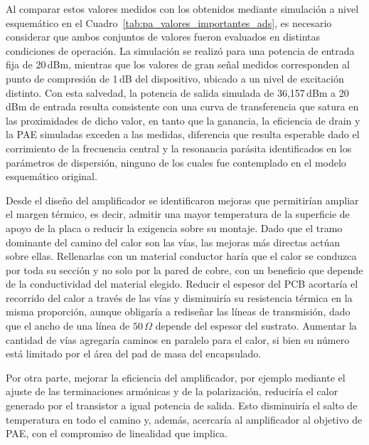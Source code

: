 Al comparar estos valores medidos con los obtenidos mediante simulación a nivel esquemático en el Cuadro~\ref{tab:pa_valores_importantes_ads}, es necesario considerar que ambos conjuntos de valores fueron evaluados en distintas condiciones de operación. La simulación se realizó para una potencia de entrada fija de 20\,dBm, mientras que los valores de gran señal medidos corresponden al punto de compresión de 1\,dB del dispositivo, ubicado a un nivel de excitación distinto. Con esta salvedad, la potencia de salida simulada de 36,157\,dBm a 20\,dBm de entrada resulta consistente con una curva de transferencia que satura en las proximidades de dicho valor, en tanto que la ganancia, la eficiencia de drain y la PAE simuladas exceden a las medidas, diferencia que resulta esperable dado el corrimiento de la frecuencia central y la resonancia parásita identificados en los parámetros de dispersión, ninguno de los cuales fue contemplado en el modelo esquemático original.

Desde el diseño del amplificador se identificaron mejoras que permitirían ampliar el margen térmico, es decir, admitir una mayor temperatura de la superficie de apoyo de la placa o reducir la exigencia sobre su montaje. Dado que el tramo dominante del camino del calor son las vías, las mejoras más directas actúan sobre ellas. Rellenarlas con un material conductor haría que el calor se conduzca por toda su sección y no solo por la pared de cobre, con un beneficio que depende de la conductividad del material elegido. Reducir el espesor del PCB acortaría el recorrido del calor a través de las vías y disminuiría su resistencia térmica en la misma proporción, aunque obligaría a rediseñar las líneas de transmisión, dado que el ancho de una línea de $50\,\Omega$ depende del espesor del sustrato. Aumentar la cantidad de vías agregaría caminos en paralelo para el calor, si bien su número está limitado por el área del pad de masa del encapsulado.

Por otra parte, mejorar la eficiencia del amplificador, por ejemplo mediante el ajuste de las terminaciones armónicas y de la polarización, reduciría el calor generado por el transistor a igual potencia de salida. Esto disminuiría el salto de temperatura en todo el camino y, además, acercaría al amplificador al objetivo de PAE, con el compromiso de linealidad que implica.